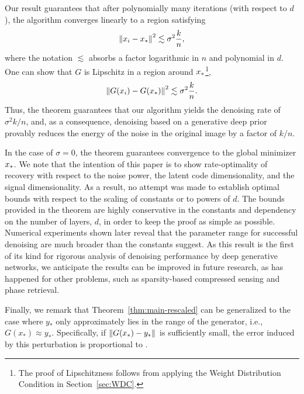 Our result guarantees that after polynomially many iterations (with respect to $d$), the algorithm converges linearly to a region satisfying
\[
{\left\|x_i - x_\ast\right\|}_{}^2
\lesssim
\sigma^2 \frac{k}{n},
\]
where the notation $\lesssim$ absorbs a factor logarithmic in $n$ and polynomial in $d$.
One can show that $G$ is Lipschitz in a region around $x_\ast$\footnote{The proof of Lipschitzness follows from applying the Weight Distribution Condition in Section~\ref{sec:WDC}.},
\[
{\left\|G(x_i) - G(x_\ast)\right\|}_{}^2
\lesssim
\sigma^2 \frac{k}{n}.
\]
Thus, the theorem guarantees that our algorithm yields the denoising rate of $\sigma^2 k/n$, and, as a consequence, denoising based on a generative deep prior provably reduces the energy of the noise in the original image by a factor of $k/n$.  

In the case of $\sigma=0$, the theorem guarantees convergence to the global minimizer $x_\ast$.   We note that the intention of this paper is to show rate-optimality of recovery with respect to the noise power, the latent code dimensionality, and the signal dimensionality.  As a result, no attempt was made to establish optimal bounds with respect to the scaling of constants or to powers of $d$.  The bounds provided in the theorem are highly conservative in the constants and dependency on the number of layers, $d$, in order to keep the proof as simple as possible.  Numerical experiments shown later reveal that the parameter range for successful denoising are much broader than the constants suggest. As this result is the first of its kind for rigorous analysis of denoising performance by deep generative networks, we anticipate the results can be improved in future research, as has happened for other problems, such as sparsity-based compressed sensing and phase retrieval.  %

Finally, we remark that Theorem~\ref{thm:main-rescaled} can be generalized to the case where $y_\ast$ only approximately lies in the range of the generator, i.e., 
$G(x_\ast) \approx y_\ast$. Specifically, if ${\left\|G(x_\ast) - y_\ast \right\|}_{}$ is sufficiently small, the error induced by this perturbation is proportional to .

